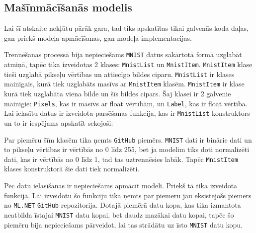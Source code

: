 \subsection{Mašīnmācīšanās modelis}

    Lai šī atskaite nekļūtu pārāk gara, tad tiks apskatītas tikai galvenās koda daļas, gan priekš
    modeļa apmācīšanas, gan modeļa implementacijas.

    Trennēšanas processā bija nepieciešams \texttt{MNIST} datus sakārtotā formā uzglabāt atmiņā, tapēc
    tika izveidotas 2 klases: \texttt{MnistList} un \texttt{MnistItem}. \texttt{MnistItem} klase tieši
    uzglabā pikseļu vērtības un attiecīgo bildes ciparu. \texttt{MnistList} ir klases mainīgais, kurā
    tiek uzglabāts masīvs ar \texttt{MnistItem} klasēm. \texttt{MnistItem} ir klase kurā tiek uzglabāta
    viena bilde un šīs bildes cipars. Šaj klasei ir 2 galvenie mainīgie: \texttt{Pixels}, kas ir masīvs
    ar float vērtībām, un \texttt{Label}, kas ir float vērtība. Lai ielasītu datus ir izveidota parsēšanas
    funkcija, kas ir \texttt{MnistList} konstruktors un to ir iespējams apskatīt sekojoši:

    

    Par piemēru šīm klasēm tika ņemts \texttt{GitHub} piemērs. \cite{paxbunPaxbunCntkMnistPractice2019}
    \texttt{MNIST} dati ir binārie dati un to pikseļu vērtības ir vērtībās no 0 līdz 255,
    bet ja modelim tiks doti normalizēti dati, kas ir vērtībās no 0 līdz 1, tad tas
    uztrennēsies labāk. Tapēc \texttt{MnistItem} klases konstruktorā šie dati tiek
    normalizēti.

    

    Pēc datu ielasīšanas ir nepieciešams apmācīt modeli. Priekš tā tika izveidota funkcija. Lai izveidotu
    šo funkciju tika ņemts par piemēru jau eksistējošs piemērs no \texttt{ML.NET} \texttt{GitHub}
    repozitorija. \cite{DotnetMachinelearningsamples2021} Dotajā piemērā datu kopa, kas tika izmantota
    neatbilda īstajai \texttt{MNIST} datu kopai, bet daudz mazākai datu kopai, tapēc šo piemēru bija
    nepieciešams pārveidot, lai tas strādātu uz īsto \texttt{MNIST} datu kopu. \cite{MNISTHandwrittenDigit}

    
